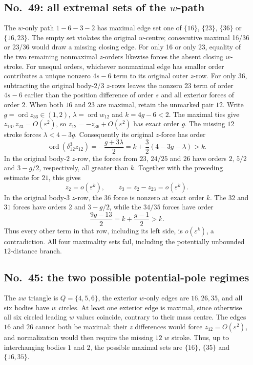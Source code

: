 \documentclass[11pt]{amsart}
\theoremstyle{remark}
\newcommand{\ord}{\operatorname{ord}}
\newcommand{\Needspace}[1]{\par\ifdim\dimexpr\pagegoal-\pagetotal\relax<#1\newpage\fi}
\begin{document}
\Needspace{12\baselineskip}
\subsection{No.~49: all extremal sets of the $w$-path}\label{sec:no49-path}
The $w$-only path $1-6-3-2$ has maximal edge set one of
$\{16\}$, $\{23\}$, $\{36\}$ or $\{16,23\}$. The empty set
violates the original $w$-centre; consecutive maximal 16/36
or 23/36 would draw a missing closing edge. For only 16 or
only 23, equality of the two remaining nonmaximal $z$-orders
likewise forces the absent closing $w$-stroke. For unequal
orders, whichever nonmaximal edge has smaller order
contributes a unique nonzero $4s-6$ term to its original
outer $z$-row. For only 36, subtracting the original body-2/3
$z$-rows leaves the nonzero 23 term of order $4s-6$ earlier
than the position difference of order $s$ and all exterior
forces of order $2$.
When both $16$ and $23$ are maximal, retain the unmarked pair $12$. Write $g=\ord z_{36}\in(1,2)$, $\lambda=\ord w_{12}$ and $k=4g-6<2$. The maximal ties give $z_{16},z_{23}=O(\varepsilon^2)$, so $z_{12}=-z_{36}+O(\varepsilon^2)$ has exact order $g$. The missing $12$ stroke forces $\lambda<4-3g$. Consequently its original $z$-force has order
\[
 \ord(\delta_{12}^3z_{12})=-\frac{g+3\lambda}{2}
 =k+\frac32(4-3g-\lambda)>k.
\]
In the original body-$2$ $z$-row, the forces from $23$, $24/25$ and $26$ have orders $2$, $5/2$ and $3-g/2$, respectively, all greater than $k$. Together with the preceding estimate for $21$, this gives
\[
 z_2=o(\varepsilon^k),\qquad
 z_3=z_2-z_{23}=o(\varepsilon^k).
\]
In the original body-$3$ $z$-row, the $36$ force is nonzero at exact order $k$. The $32$ and $31$ forces have orders $2$ and $3-g/2$, while the $34/35$ forces have order
\[
 \frac{9g-13}{2}=k+\frac{g-1}{2}>k.
\]
Thus every other term in that row, including its left side, is $o(\varepsilon^k)$, a contradiction. All four maximality sets fail, including the potentially unbounded $12$-distance branch.
\Needspace{18\baselineskip}
\subsection{No.~45: the two possible potential-pole regimes}
\label{sec:no45-pole}
The $zw$ triangle is $Q=\{4,5,6\}$, the exterior $w$-only edges are $16,26,35$, and all six bodies have $w$ circles.
At least one exterior edge is maximal, since otherwise all six circled leading $w$ values coincide, contrary to their mass centre.
The edges $16$ and $26$ cannot both be maximal: their $z$ differences would force $z_{12}=O(\varepsilon^2)$, and normalization would then require the missing $12$ $w$ stroke.
Thus, up to interchanging bodies $1$ and $2$, the possible maximal sets are $\{16\}$, $\{35\}$ and $\{16,35\}$.
\end{document}

